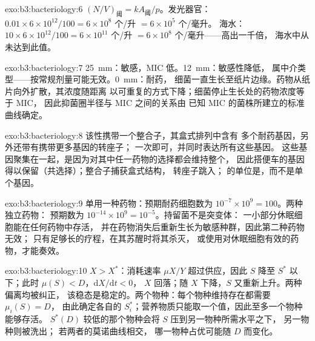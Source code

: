 \begin{solution}{exo:b3:bacteriology:6}
$(N/V)_{\text{阈}} = kA_{\text{阈}}/p$。发光器官：$0.01\times
6\times 10^{12}/100 = 6\times 10^{8}$ 个/升 $= 6\times 10^{5}$ 个/毫升。
海水：$10\times 6\times 10^{12}/100 = 6\times 10^{11}$ 个/升
$= 6\times 10^{8}$ 个/毫升——高出一千倍，
海水中从未达到此值。
\end{solution}

\begin{solution}{exo:b3:bacteriology:7}
\qty{25}{mm}：敏感，MIC 低。\qty{12}{mm}：敏感性降低，
属中介类型——按常规剂量可能无效。\qty{0}{mm}：耐药，
细菌一直生长至纸片边缘。药物从纸片向外扩散，其浓度随距离
以可重复的方式下降；细菌停止生长处的药物浓度等于 MIC，
因此抑菌圈半径与 MIC 之间的关系由
已知 MIC 的菌株所建立的标准曲线确定。
\end{solution}

\begin{solution}{exo:b3:bacteriology:8}
该性携带一个整合子，其盒式排列中含有
多个耐药基因，另外还带有携带更多基因的转座子；
一次即可，并同时表达所有这些基因。
这些基因聚集在一起，是因为对其中任一药物的选择都会维持整个，
因此搭便车的基因得以保留（共选择）；整合子捕获盒式结构，
转座子跳入；
的单位是，而不是单个基因。
\end{solution}

\begin{solution}{exo:b3:bacteriology:9}
单用一种药物：预期耐药细胞数为 $10^{-7}\times 10^{9} = 100$。两种独立药物：
预期数为 $10^{-14}\times 10^{9} = 10^{-5}$。持留菌不是突变体：
一小部分休眠细胞能在任何药物中存活，
并在药物消失后重新生长为敏感种群，因此第二种药物无效；
只有足够长的疗程，在其苏醒时将其杀灭，
或使用对休眠细胞有效的药物，才能奏效。
\end{solution}

\begin{solution}{exo:b3:bacteriology:10}
$X > X^{*}$：消耗速率 $\mu X/Y$ 超过供应，因此 $S$ 降至
$S^{*}$ 以下；此时 $\mu(S) < D$，$\mathrm{d}X/\mathrm{d}t < 0$，
$X$ 回落；随 $X$ 下降，$S$ 又重新上升。两种偏离均被纠正，
该稳态是稳定的。两个物种：每个物种维持存在都需要 $\mu_{i}(S) = D$，
由此确定各自的 $S_{i}^{*}$；营养物质只能取一个值，因此至多一个物种能够存活。
$S^{*}(D)$ 较低的那个物种会将 $S$ 压到另一物种所需水平之下，
另一物种则被洗出；
若两者的莫诺曲线相交，
哪一物种占优可能随 $D$ 而变化。
\end{solution}

